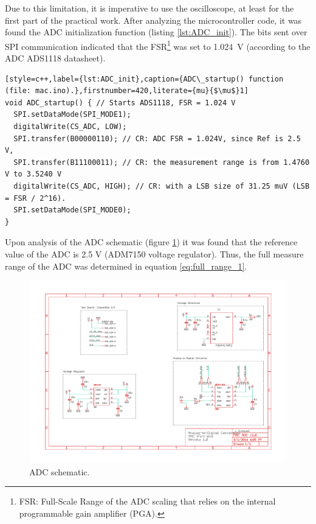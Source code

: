 \documentclass[a4paper,12pt]{article}
\begin{document}
Due to this limitation, it is imperative to use the oscilloscope, at least for the first part of the practical work. After analyzing the microcontroller code, it was found the ADC initialization function (listing \ref{lst:ADC_init}). The bits sent over SPI communication indicated that the FSR\footnote{FSR: Full-Scale Range of the ADC scaling that relies on the internal programmable gain amplifier (PGA).} was set to \mbox{1.024 V} (according to the ADC ADS1118 datasheet).
\begin{lstlisting}[style=c++,label={lst:ADC_init},caption={ADC\_startup() function (file: mac.ino).},firstnumber=420,literate={mu}{$\mu$}1]
void ADC_startup() { // Starts ADS1118, FSR = 1.024 V
  SPI.setDataMode(SPI_MODE1);
  digitalWrite(CS_ADC, LOW);
  SPI.transfer(B00000110); // CR: ADC FSR = 1.024V, since Ref is 2.5 V, 
  SPI.transfer(B11100011); // CR: the measurement range is from 1.4760 V to 3.5240 V
  digitalWrite(CS_ADC, HIGH); // CR: with a LSB size of 31.25 muV (LSB = FSR / 2^16).
  SPI.setDataMode(SPI_MODE0);
}
\end{lstlisting}

Upon analysis of the ADC schematic (figure \ref{fig:adc_sch}) it was found that the reference value of the ADC is 2.5 V (ADM7150 voltage regulator). Thus, the full measure range of the ADC was determined in equation \ref{eq:full_range_1}.
\begin{figure}[!h]
    \centering
    \includegraphics[width=\textwidth]{Images/MAC ADC v1.0.pdf}
    \captionsetup{justification=centering}
    \caption{ADC schematic.} 
    \label{fig:adc_sch}
\end{figure}
\end{document}

